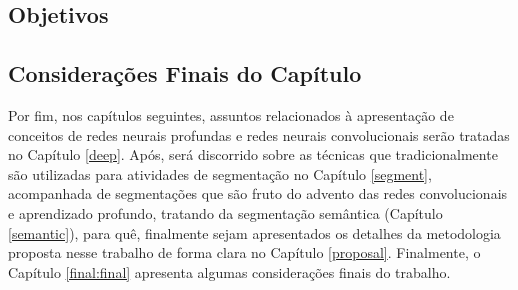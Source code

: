 \subsection{Objetivos}
\label{intro:objective}

\subsection{Considerações Finais do Capítulo}
\label{intro:end}

Por fim, nos capítulos seguintes, assuntos relacionados à apresentação de conceitos de redes neurais profundas e redes neurais convolucionais serão tratadas no Capítulo \ref{deep}. Após, será discorrido sobre as técnicas que tradicionalmente são utilizadas para atividades de segmentação no Capítulo \ref{segment}, acompanhada de segmentações que são fruto do advento das redes convolucionais e aprendizado profundo, tratando da segmentação semântica (Capítulo \ref{semantic}), para quê, finalmente sejam apresentados os detalhes da metodologia proposta nesse trabalho de forma clara no Capítulo \ref{proposal}.  Finalmente, o Capítulo \ref{final:final} apresenta algumas considerações finais do trabalho.